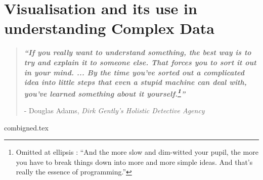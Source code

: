 


\chapter{ Visualisation and its use in understanding Complex Data }\label{ch1}

\blankpage
\restoregeometry
\vspace*{0.15\paperheight}



\begin{center}
\begin{quotation}
  \large{\emph{\textbf{``If you really want to understand something, the best way is to try and explain it to someone else. That forces you to sort it out in your mind. ... By the time you’ve sorted out a complicated idea into little steps that even a stupid machine can deal with, you’ve learned something about it yourself.\footnote{ Omitted at ellipsis : ``And the more slow and dim-witted your pupil, the more you have to break things down into more and more simple ideas. And that’s really the essence of programming.''}''} }  }  \\
  \begin{flushright}
  - Douglas Adams, \textit{Dirk Gently's Holistic Detective Agency}
  \end{flushright}
 \end{quotation}
\end{center}
\doublespacing
\newpage

%




{combigned.tex}

\chapterbib
